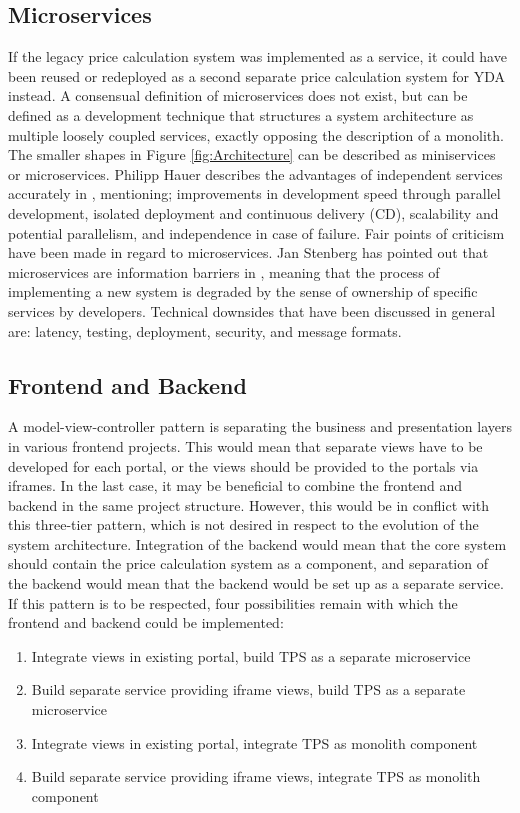 \subsection{Microservices}
If the legacy price calculation system was implemented as a service, it could have been reused or redeployed as a second separate price calculation system for YDA instead. A consensual definition of microservices does not exist, but can be defined as a development technique that structures a system architecture as multiple loosely coupled services, exactly opposing the description of a monolith. The smaller shapes in Figure \ref{fig:Architecture} can be described as miniservices or microservices. Philipp Hauer describes the advantages of independent services accurately in \cite{microservices}, mentioning; improvements in development speed through parallel development, isolated deployment and continuous delivery (CD), scalability and potential parallelism, and independence in case of failure. Fair points of criticism have been made in regard to microservices. Jan Stenberg has pointed out that microservices are information barriers in \cite{JS-microservices}, meaning that the process of implementing a new system is degraded by the sense of ownership of specific services by developers. Technical downsides that have been discussed in general are: latency, testing, deployment, security, and message formats.

\subsection{Frontend and Backend}
A model-view-controller pattern is separating the business and presentation layers in various frontend projects. This would mean that separate views have to be developed for each portal, or the views should be provided to the portals via iframes. In the last case, it may be beneficial to combine the frontend and backend in the same project structure. However, this would be in conflict with this three-tier pattern, which is not desired in respect to the evolution of the system architecture. Integration of the backend would mean that the core system should contain the price calculation system as a component, and separation of the backend would mean that the backend would be set up as a separate service. If this pattern is to be respected, four possibilities remain with which the frontend and backend could be implemented:

\begin{enumerate}
	\item Integrate views in existing portal, build TPS as a separate microservice
	\item Build separate service providing iframe views, build TPS as a separate microservice
	\item Integrate views in existing portal, integrate TPS as monolith component
	\item Build separate service providing iframe views, integrate TPS as monolith component
\end{enumerate}

